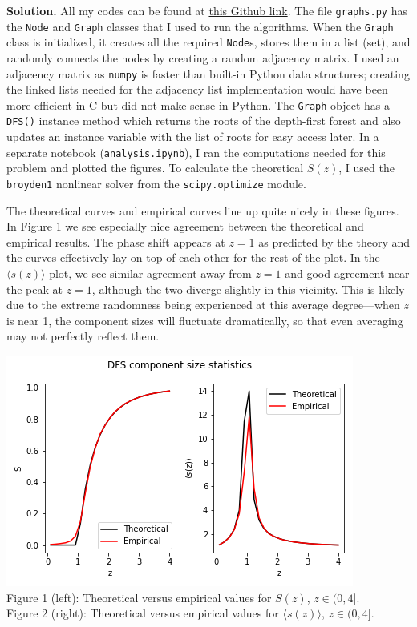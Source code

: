 \documentclass{letter}
\newcounter{problem}
\newcommand{\Solution}[1]{%
	\textbf{Solution.} #1 \par%
}
\begin{document}
    \Solution{All my codes can be found at \href{https://github.com/thoffman1/amsc808n/tree/master/hws/hw6}{this Github link}. The file \texttt{graphs.py} has the \texttt{Node} and \texttt{Graph} classes that I used to run the algorithms. When the \texttt{Graph} class is initialized, it creates all the required \texttt{Node}s, stores them in a list (set), and randomly connects the nodes by creating a random adjacency matrix. I used an adjacency matrix as \texttt{numpy} is faster than built-in Python data structures; creating the linked lists needed for the adjacency list implementation would have been more efficient in C but did not make sense in Python. The \texttt{Graph} object has a \texttt{DFS()} instance method which returns the roots of the depth-first forest and also updates an instance variable with the list of roots for easy access later. In a separate notebook (\texttt{analysis.ipynb}), I ran the computations needed for this problem and plotted the figures. To calculate the theoretical $S(z)$, I used the \texttt{broyden1} nonlinear solver from the \texttt{scipy.optimize} module.

    The theoretical curves and empirical curves line up quite nicely in these figures. In Figure 1 we see especially nice agreement between the theoretical and empirical results. The phase shift appears at $z = 1$ as predicted by the theory and the curves effectively lay on top of each other for the rest of the plot. In the $\langle s(z) \rangle$ plot, we see similar agreement away from $z = 1$ and good agreement near the peak at $z = 1$, although the two diverge slightly in this vicinity. This is likely due to the extreme randomness being experienced at this average degree---when $z$ is near 1, the component sizes will fluctuate dramatically, so that even averaging may not perfectly reflect them.

    \begin{center} 
        \includegraphics{../code/dfsstats.png} \\
        Figure 1 (left): Theoretical versus empirical values for $S(z)$, $z \in (0, 4]$. \\
        Figure 2 (right): Theoretical versus empirical values for $\langle s(z) \rangle$, $z \in (0, 4]$.
    \end{center}}
\end{document}
